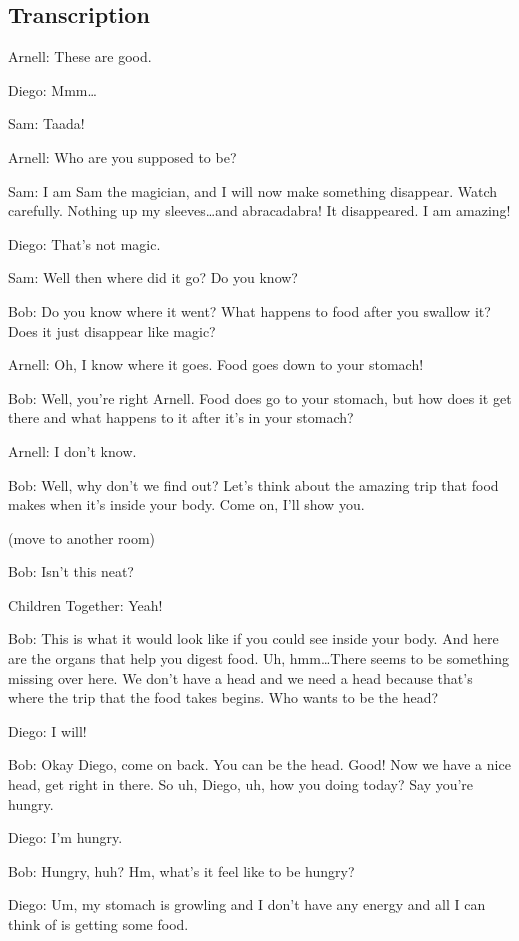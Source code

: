 \subsection{Transcription}

Arnell: These are good.

Diego: Mmm\dots

Sam: Taada!

Arnell: Who are you supposed to be?

Sam: I am Sam the magician, and I will now make something disappear. Watch carefully. Nothing up my sleeves\dots and abracadabra! It disappeared. I am amazing!

Diego: That's not magic.

Sam: Well then where did it go? Do you know?

Bob: Do you know where it went? What happens to food after you swallow it? Does it just disappear like magic?

Arnell: Oh, I know where it goes. Food goes down to your stomach!

Bob: Well, you're right Arnell. Food does go to your stomach, but how does it get there and what happens to it after it's in your stomach?

Arnell: I don't know.

Bob: Well, why don't we find out? Let's think about the amazing trip that food makes when it's inside your body. Come on, I'll show you.

(move to another room)

Bob: Isn't this neat?

Children Together: Yeah!

Bob: This is what it would look like if you could see inside your body. And here are the organs that help you digest food. Uh, hmm\dots There seems to be something missing over here. We don't have a head and we need a head because that's where the trip that the food takes begins. Who wants to be the head?

Diego: I will!

Bob: Okay Diego, come on back. You can be the head. Good! Now we have a nice head, get right in there. So uh, Diego, uh, how you doing today? Say you're hungry.

Diego: I'm hungry.

Bob: Hungry, huh? Hm, what's it feel like to be hungry?

Diego: Um, my stomach is growling and I don't have any energy and all I can think of is getting some food.

